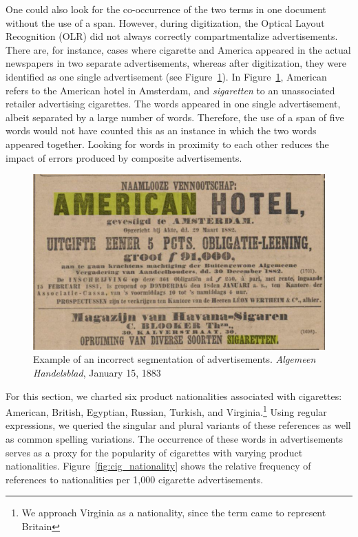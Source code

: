 \documentclass[USenglish]{article}
\begin{document}
One could also look for the co-occurrence of the two terms in one document without the use of a span. However, during digitization, the Optical Layout Recognition (OLR) did not always correctly compartmentalize advertisements. There are, for instance, cases where cigarette and America appeared in the actual newspapers in two separate advertisements, whereas after digitization, they were identified as one single advertisement (see Figure~\ref{fig:segmentation}). In Figure~\ref{fig:segmentation}, American refers to the American hotel in Amsterdam, and \textit{sigaretten} to an unassociated retailer advertising cigarettes. The words appeared in one single advertisement, albeit separated by a large number of words. Therefore, the use of a span of five words would not have counted this as an instance in which the two words appeared together. Looking for words in proximity to each other reduces the impact of errors produced by composite advertisements.

\begin{figure}%
  \centering
  \includegraphics[width=.9\textwidth]{figures/segmentation_error}%
  \caption{Example of an incorrect segmentation of advertisements. \textit{Algemeen Handelsblad}, January 15, 1883}%
  \label{fig:segmentation}%
\end{figure}

For this section, we charted six product nationalities associated with cigarettes: American, British, Egyptian, Russian, Turkish, and Virginia.\footnote{We approach Virginia as a nationality, since the term came to represent Britain} Using regular expressions, we queried the singular and plural variants of these references as well as common spelling variations. The occurrence of these words in advertisements serves as a proxy for the popularity of cigarettes with varying product nationalities. Figure~\ref{fig:cig_nationality} shows the relative frequency of references to nationalities per 1,000 cigarette advertisements. 
\end{document}
